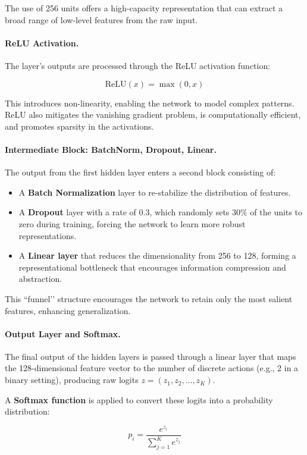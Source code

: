\documentclass{report}
\begin{document}
The use of 256 units offers a high-capacity representation that can extract a broad range of low-level features from the raw input.

\paragraph{ReLU Activation.}
The layer’s outputs are processed through the ReLU activation function:

\[
\text{ReLU}(x) = \max(0, x)
\]

This introduces non-linearity, enabling the network to model complex patterns. ReLU also mitigates the vanishing gradient problem, is computationally efficient, and promotes sparsity in the activations.

\paragraph{Intermediate Block: BatchNorm, Dropout, Linear.}
The output from the first hidden layer enters a second block consisting of:
\begin{itemize}
    \item A \textbf{Batch Normalization} layer to re-stabilize the distribution of features.
    \item A \textbf{Dropout} layer with a rate of 0.3, which randomly sets 30\% of the units to zero during training, forcing the network to learn more robust representations.
    \item A \textbf{Linear layer} that reduces the dimensionality from 256 to 128, forming a representational bottleneck that encourages information compression and abstraction.
\end{itemize}

This ``funnel’’ structure encourages the network to retain only the most salient features, enhancing generalization.

\paragraph{Output Layer and Softmax.}
The final output of the hidden layers is passed through a linear layer that maps the 128-dimensional feature vector to the number of discrete actions (e.g., 2 in a binary setting), producing raw logits \( z = (z_1, z_2, \ldots, z_K) \).

A \textbf{Softmax function} is applied to convert these logits into a probability distribution:

\[
p_i = \frac{e^{z_i}}{\sum_{j=1}^K e^{z_j}}
\]
\end{document}
